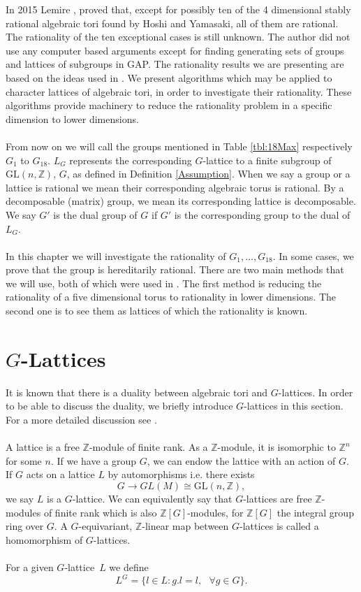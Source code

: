 \documentclass[a4paper, 14pt]{extarticle}
\theoremstyle{plain}
\theoremstyle{definition}
\newcommand{\Z}{\ensuremath{\mathbb{Z}}}
\newcommand{\G}{G}
\newcommand{\glat}{$G$-lattice}
\begin{document}
\noindent
In 2015 Lemire \cite{Nicole1}, proved that, except for possibly ten of the 
4 dimensional stably rational algebraic tori found by Hoshi and Yamasaki, 
all of them are rational. The rationality of the ten exceptional cases is 
still unknown. The author did not use any computer based arguments except 
for finding generating sets of groups and lattices of subgroups in GAP. The 
rationality results we are presenting are based on the ideas used in \cite{Nicole1}. 
We present algorithms which may be applied to character lattices of algebraic 
tori, in order to investigate their rationality. These algorithms provide 
machinery to reduce the rationality problem in a specific dimension to lower dimensions.\\
\\
From now on we will call the groups mentioned in Table \ref{tbl:18Max} 
respectively $G_1$ to $G_{18}$. $L_G$ represents the corresponding $G$-lattice 
to a finite subgroup of $\mathrm{GL}(n,\Z)$, $G$, as defined in Definition 
\ref{Assumption}. When we say a group or a lattice is rational we mean their 
corresponding algebraic torus is rational. By a decomposable (matrix) group, 
we mean its corresponding lattice is decomposable. We say $G'$ is the dual 
group of $G$ if $G'$ is the corresponding group to the dual of $L_G$.  \\
\\
In this chapter we will investigate the rationality of $G_1, \ldots ,  G_{18}$. 
In some cases, we prove that the group is hereditarily rational. There are two 
main methods that we will use, both of which were used in \cite{Nicole1}. The 
first method is reducing the rationality of a five dimensional torus to rationality 
in lower dimensions. The second one is to see them as lattices of which the rationality is known.

\section{$G$-Lattices}\label{G-Lattices}
It is known that there is a duality between algebraic tori and \glat s. In order to be able to discuss the duality, we briefly introduce \glat s in this section. For a more detailed discussion see \cite[Chapters 1 and 2]{Lorenz}.\\ \\
A lattice is a free $\mathbb{Z}$-module of finite rank. As a $\Z$-module, it is isomorphic to $\mathbb{Z}^n$ for some $n$. If we have a group $G$, we can endow the lattice with an action of $G$. If $G$ acts on a lattice $L$ by automorphisms i.e. there exists $$ G \longrightarrow GL(M) \cong \mathrm{GL}(n,\mathbb{Z}),$$ 
we say $L$ is a $G$-lattice. We can equivalently say that $\G$-lattices are free $\Z$-modules of finite rank which is also $\mathbb{Z}[G]$-modules, for $\mathbb{Z}[G]$ the integral group ring over $G$. A $G$-equivariant, $ \mathbb{Z}$-linear map between $G$-lattices is called a homomorphism of $G$-lattices.\\
\\For a given \glat \, $L$ we define $$ L^\G = \lbrace l \in L : g.l=l,  \,\, \,\,  \forall g \in \G \rbrace. $$
\end{document}
